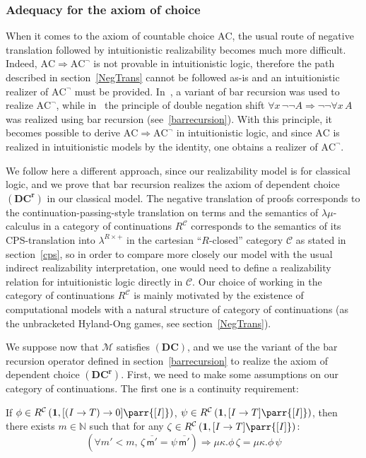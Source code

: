 \documentclass{CSML}
\newcommand*\LogVarA{x}
\newcommand*\LogImp{\mathbin{\Rightarrow}}
\newcommand*\LogFormA{A}
\newcommand*\ModM{\mathcal{M}}
\newcommand*\LmSortBot0
\newcommand*\LmSortTo\to
\newcommand*\LmSortA{T}
\newcommand*\LmConst[1]{\mathsf{#1}}
\newcommand*\Lam{\lambda^{R\times+}}
\newcommand*\CatC{\mathcal{C}}
\newcommand*\CatR{R}
\newcommand*\CatRC{\CatExp{\CatR}{\CatC}}
\newcommand*\CatExp[2]{#1^{#2}}
\newcommand*\CatPar\parr
\newcommand*\CatRCHomA\phi
\newcommand*\CatRCHomB\psi
\newcommand*\CatRCHomC\zeta
\newcommand*\CatTerm{\mathbf{1}}
\newcommand*\CatInterpSort[1]{{\left[#1\right]}}
\newcommand*\CAAxName[1]{{\bm{\scriptstyle(#1)}}}
\newcommand*\CADCUnrelName{\CAAxName{DC}}
\newcommand*\CADCName{\CAAxName{DC^r}}
\newcommand*\CALmn[1]{\LmConst{\overline{#1}}}
\newcommand*\CALmnSort{I}
\begin{document}
\subsubsection{Adequacy for the axiom of choice}
\label{ChoiceAdequacy}
When it comes to the axiom of countable choice $\mathrm{AC}$, the usual route of negative translation followed by intuitionistic realizability becomes much more difficult. Indeed, $\mathrm{AC}\LogImp\mathrm{AC}^\neg$ is not provable in intuitionistic logic, therefore the path described in section~\ref{NegTrans} cannot be followed as-is and an intuitionistic realizer of $\mathrm{AC}^\neg$ must be provided. In~\cite{BerardiBezemCoquand}, a variant of bar recursion was used to realize $\mathrm{AC}^\neg$, while in~\cite{BergerOlivaChoice} the principle of double negation shift $\forall\LogVarA\,\neg\neg\LogFormA\LogImp\neg\neg\forall\LogVarA\,\LogFormA$ was realized using bar recursion (see~\ref{barrecursion}). With this principle, it becomes possible to derive $\mathrm{AC}\LogImp\mathrm{AC}^\neg$ in intuitionistic logic, and since $\mathrm{AC}$ is realized in intuitionistic models by the identity, one obtains a realizer of $\mathrm{AC}^\neg$.\par
We follow here a different approach, since our realizability model is for classical logic, and we prove that bar recursion realizes the axiom of dependent choice $\CADCName$ in our classical model. The negative translation of proofs corresponds to the continuation-passing-style translation on terms and the semantics of $\lambda\mu$-calculus in a category of continuations $\CatRC$ corresponds to the semantics of its CPS-translation into $\Lam$ in the cartesian ``$\CatR$-closed'' category $\CatC$ as stated in section~\ref{cps}, so in order to compare more closely our model with the usual indirect realizability interpretation, one would need to define a realizability relation for intuitionistic logic directly in $\CatC$. Our choice of working in the category of continuations $\CatRC$ is mainly motivated by the existence of computational models with a natural structure of category of continuations (as the unbracketed Hyland-Ong games, see section~\ref{NegTrans}).\par
We suppose now that $\ModM$ satisfies $\CADCUnrelName$, and we use the variant of the bar recursion operator defined in section~\ref{barrecursion} to realize the axiom of dependent choice $\CADCName$. First, we need to make some assumptions on our category of continuations. The first one is a continuity requirement:
\begin{defi}[Continuity]
\label{continuity}
If $\CatRCHomA\in\CatRC\left(\CatTerm,\CatInterpSort{\left(\CALmnSort\LmSortTo\LmSortA\right)\LmSortTo\LmSortBot}\CatPar\CatInterpSort{\CALmnSort}\right)$, $\CatRCHomB\in\CatRC\left(\CatTerm,\CatInterpSort{\CALmnSort\LmSortTo\LmSortA}\CatPar\CatInterpSort{\CALmnSort}\right)$, then there exists $m\in\mathbb{N}$ such that for any $\CatRCHomC\in\CatRC\left(\CatTerm,\CatInterpSort{\CALmnSort\LmSortTo\LmSortA}\CatPar\CatInterpSort{\CALmnSort}\right)$:
$$\left(\forall m'<m,\,\CatRCHomC\,\CALmn{m'}=\CatRCHomB\,\CALmn{m'}\right)\LogImp\mu\kappa.\CatRCHomA\,\CatRCHomC=\mu\kappa.\CatRCHomA\,\CatRCHomB$$
\end{defi}\medskip
\end{document}
